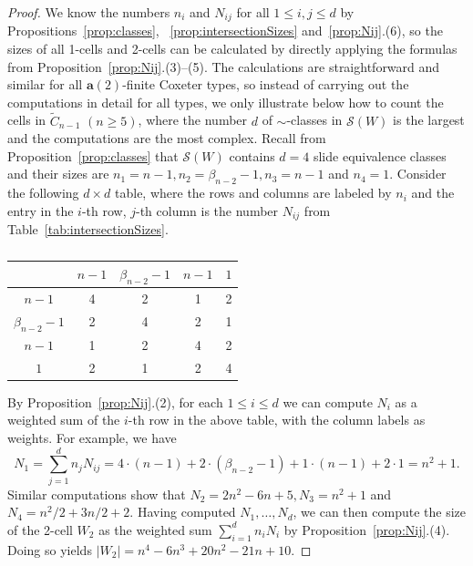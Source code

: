 \documentclass[ALCO,Unicode,published]{cedram}
\newcommand{\la}{\mathbf{a}}
\newcommand{\sw}{\mathcal{S}(W)}
\newcommand{\abs}[1]{\lvert #1 \rvert}
\begin{document}
\begin{proof}
  We know the numbers $n_i$ and $N_{ij}$ for all $1\le i,j\le d$ by Propositions~\ref{prop:classes},
 ~\ref{prop:intersectionSizes} and~\ref{prop:Nij}.(6), so the sizes of all 1-cells and 2-cells can
  be calculated by directly applying the formulas from Proposition~\ref{prop:Nij}.(3)--(5).  The calculations
  are straightforward and similar for all $\la(2)$-finite Coxeter types, so instead of carrying out
  the computations in detail for all types, we only illustrate below how to count the cells in
  $\tilde C_{n-1}$ $(n\ge 5)$, where the number $d$ of $\sim$-classes in $\sw$ is the largest and the
  computations are the most complex.  Recall from Proposition~\ref{prop:classes} that $\sw$ contains $d=4$
  slide equivalence classes and their sizes are $n_1=n-1, n_2=\beta_{n-2}-1,n_3=n-1$ and $n_4=1$.
  Consider the following $d\times d$ table, where the rows and columns are labeled by $n_i$ and the
  entry in the $i$-th row, $j$-th column is the number $N_{ij}$ from Table~\ref{tab:intersectionSizes}. 

    \begin{table} \centering
        \begin{tabular}{|c|c|c|c|c|} \hline 
            &$n-1$ & $\beta_{n-2}-1$ & $n-1$ & $1$\\\hline
           $n-1$ & 4 & 2  & 1 & 2\\\hline
           $\beta_{n-2}-1$ & 2 & 4  & 2 & 1\\\hline
           $n-1$ & 1 & 2  & 4 & 2\\\hline
           $1$ & 2 &  1&2   & 4\\\hline
       \end{tabular} \vspace{1em} 
        \caption{}
    \end{table}
    By Proposition~\ref{prop:Nij}.(2), for each $1\le i\le d$ we can compute $N_i$ as a weighted sum of the $i$-th row in the
    above table, with the column labels as weights. For example, we have
    \[
        N_1 =\sum_{j=1}^d n_jN_{ij}= 4\cdot (n-1) + 2\cdot (\beta_{n-2}-1) + 1 \cdot (n-1) + 2 \cdot 1 = n^2+1.
    \]
    Similar computations show that $N_2= 2n^2-6n+5, N_3=n^2+1$ and $N_4= n^2/2+3n/2+2$. 
    Having computed $N_1,\dots, N_d$, we can then compute the size of the 2-cell $W_2$ as the
    weighted sum $\sum_{i=1}^d n_i N_i$ by Proposition~\ref{prop:Nij}.(4). Doing so yields $ \abs{W_2}= n^4-6n^3+20n^2-21n+10$.
\end{proof} 
\end{document}
